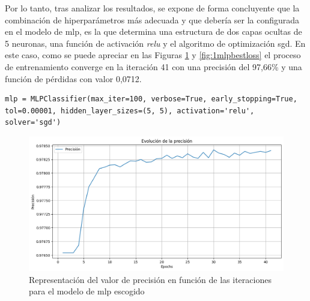\vspace{3mm}

Por lo tanto, tras analizar los resultados, se expone de forma concluyente que la combinación de hiperparámetros más adecuada y que debería ser la configurada en el modelo de \gls{mlp}, es la que determina una estructura de dos capas ocultas de 5 neuronas, una función de activación \textit{relu} y el algoritmo de optimización \gls{sgd}. En este caso, como se puede apreciar en las Figuras \ref{fig:1mlpbestacc} y \ref{fig:1mlpbestloss} el proceso de entrenamiento converge en la iteración 41 con una precisión del 97,66\% y una función de pérdidas con valor 0,0712.

\vspace{3mm}

\begin{lstlisting}[style=Python, caption={Clasificador MLP óptimo}]
  mlp = MLPClassifier(max_iter=100, verbose=True, early_stopping=True, tol=0.00001, hidden_layer_sizes=(5, 5), activation='relu', solver='sgd')
\end{lstlisting}

\vspace{3mm}

\begin{figure}[H]
  \centering
  \includegraphics[width=1\textwidth]{img/desarrollo/ann/1mlpbestacc.png}
  \caption{Representación del valor de precisión en función de las iteraciones para el modelo de \acrshort{mlp} escogido}
  \label{fig:1mlpbestacc}
\end{figure}

